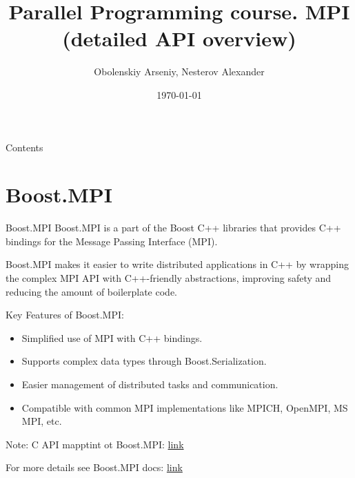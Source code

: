 \documentclass{beamer}
\title[Parallel Programming. MPI (detailed API overview)]{Parallel Programming course. MPI (detailed API overview)}
\author{Obolenskiy Arseniy, Nesterov Alexander}
\institute{Nizhny Novgorod State University}
\date{\today} %
\begin{document}
\begin{frame}
    \titlepage
\end{frame}

\begin{frame}{Contents}
    \tableofcontents
\end{frame}

\section{Boost.MPI}

\begin{frame}{Boost.MPI}
  Boost.MPI is a part of the Boost C++ libraries that provides C++ bindings for the Message Passing Interface (MPI).

  Boost.MPI makes it easier to write distributed applications in C++ by wrapping the complex MPI API with C++-friendly abstractions, improving safety and reducing the amount of boilerplate code.

  Key Features of Boost.MPI:
  \begin{itemize}
    \item Simplified use of MPI with C++ bindings.
    \item Supports complex data types through Boost.Serialization.
    \item Easier management of distributed tasks and communication.
    \item Compatible with common MPI implementations like MPICH, OpenMPI, MS MPI, etc.
  \end{itemize}

  Note: C API mapptint ot Boost.MPI: \href{https://www.boost.org/doc/libs/1_86_0/doc/html/mpi/c_mapping.html}{link}

  {\footnotesize For more details see Boost.MPI docs: \href{https://www.boost.org/doc/libs/1_86_0/doc/html/mpi.html}{link}}
\end{frame}
\end{document}
